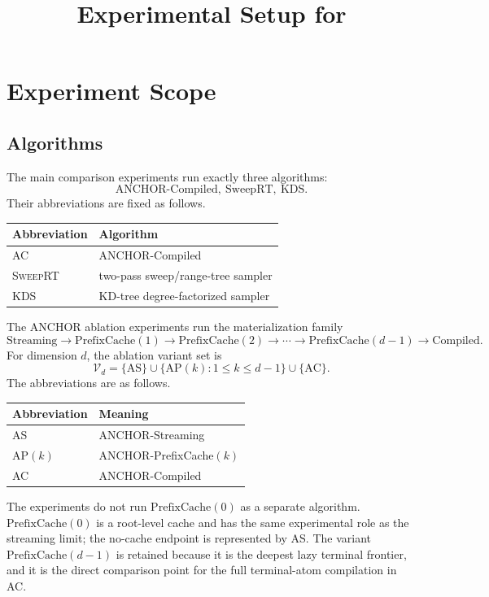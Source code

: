 \documentclass[11pt]{article}
\title{Experimental Setup for \ANCHOR}
\author{}
\date{}
\newcommand{\ANCHOR}{\textsc{ANCHOR}}
\newcommand{\AC}{\textsc{AC}}
\newcommand{\AS}{\textsc{AS}}
\newcommand{\AP}{\textsc{AP}}
\newcommand{\SweepRT}{\textsc{SweepRT}}
\newcommand{\KDS}{\textsc{KDS}}
\begin{document}
\maketitle

\section{Experiment Scope}

\subsection{Algorithms}
The main comparison experiments run exactly three algorithms:
\[
\boxed{\mathrm{ANCHOR\text{-}Compiled},\ \mathrm{SweepRT},\ \mathrm{KDS}}.
\]
Their abbreviations are fixed as follows.

\begin{center}
\begin{tabularx}{0.78\linewidth}{@{}lY@{}}
\toprule
Abbreviation & Algorithm \\
\midrule
\AC & \ANCHOR{}-Compiled \\
\SweepRT & two-pass sweep/range-tree sampler \\
\KDS & KD-tree degree-factorized sampler \\
\bottomrule
\end{tabularx}
\end{center}

The \ANCHOR{} ablation experiments run the materialization family
\[
\boxed{
\mathrm{Streaming}
\rightarrow
\mathrm{PrefixCache}(1)
\rightarrow
\mathrm{PrefixCache}(2)
\rightarrow
\cdots
\rightarrow
\mathrm{PrefixCache}(d-1)
\rightarrow
\mathrm{Compiled}
}.
\]
For dimension $d$, the ablation variant set is
\[
\mathcal{V}_d
=
\{\mathrm{AS}\}
\cup
\{\mathrm{AP}(k):1\le k\le d-1\}
\cup
\{\mathrm{AC}\}.
\]
The abbreviations are as follows.

\begin{center}
\begin{tabularx}{0.78\linewidth}{@{}lY@{}}
\toprule
Abbreviation & Meaning \\
\midrule
\AS & \ANCHOR{}-Streaming \\
\AP$(k)$ & \ANCHOR{}-PrefixCache$(k)$ \\
\AC & \ANCHOR{}-Compiled \\
\bottomrule
\end{tabularx}
\end{center}

The experiments do not run $\mathrm{PrefixCache}(0)$ as a separate algorithm.  $\mathrm{PrefixCache}(0)$ is a root-level cache and has the same experimental role as the streaming limit; the no-cache endpoint is represented by \AS.  The variant $\mathrm{PrefixCache}(d-1)$ is retained because it is the deepest lazy terminal frontier, and it is the direct comparison point for the full terminal-atom compilation in \AC.
\end{document}
